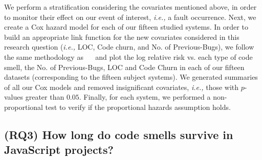\documentclass[smallcondensed]{svjour3}
\newcommand{\ie}{{\textit{i.e.,}}}
\begin{document}
{%
%
%
%
%
We perform a stratification considering the covariates mentioned above, in order to monitor their effect on our event of interest, \ie{} a fault occurrence. Next, we create a Cox hazard model for each of our fifteen studied systems.
In order to build an appropriate link function for the new covariates considered in this research question (\ie{} LOC, Code churn, and No. of Previous-Bugs), we follow the same methodology as ~\cite{koru2008theory}~\cite{selim2010studying} and plot the log relative risk vs. each type of code smell, the No. of Previous-Bugs, LOC and Code Churn in each of our fifteen datasets (corresponding to the fifteen subject systems). We generated summaries of all our Cox models and removed insignificant covariates, \ie{} those with $p$-values greater than $0.05$. Finally, for each system, we performed a non-proportional test to verify if the proportional hazards assumption holds.

\subsection*{(RQ3) How long do code smells survive in JavaScript projects?}\label{AnalysisRQ3}

}
\end{document}

